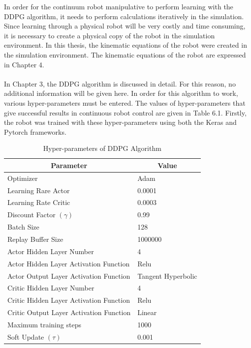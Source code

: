 \documentclass[12pt,twoside,a4]{mwbk}
\begin{document}
\noindent In order for the continuum robot manipulative to perform learning with the DDPG algorithm, it needs to perform calculations iteratively in the simulation. Since learning through a physical robot will be very costly and time consuming, it is necessary to create a physical copy of the robot in the simulation environment. In this thesis, the kinematic equations of the robot were created in the simulation environment. The kinematic equations of the robot are expressed in Chapter 4.
\\ \\
In Chapter 3, the DDPG algorithm is discussed in detail. For this reason, no additional information will be given here. In order for this algorithm to work, various hyper-parameters must be entered. The values of hyper-parameters that give successful results in continuous robot control are given in Table 6.1. Firstly, the robot was trained with these hyper-parameters using both the Keras and Pytorch frameworks.
\newpage
\begin{table}[h!]
\centering
\begin{tabular}{||c c||} 
 \hline
 \textbf{Parameter} & \textbf{Value} \\ [0.5ex] 
    \hline\hline
    \multicolumn{1}{|l|}{Optimizer} & \multicolumn{1}{l|}{Adam} \\ \hline
    \multicolumn{1}{|l|}{Learning Rare Actor} & \multicolumn{1}{l|}{0.0001} \\ \hline
    \multicolumn{1}{|l|}{Learning Rate Critic} & \multicolumn{1}{l|}{0.0003} \\ \hline
    \multicolumn{1}{|l|}{Discount Factor $(\gamma)$} & \multicolumn{1}{l|}{0.99} \\ \hline
    \multicolumn{1}{|l|}{Batch Size} & \multicolumn{1}{l|}{128} \\ \hline
    \multicolumn{1}{|l|}{Replay Buffer Size} & \multicolumn{1}{l|}{1000000} \\ \hline
    \multicolumn{1}{|l|}{Actor Hidden Layer Number} & \multicolumn{1}{l|}{4} \\ \hline
    \multicolumn{1}{|l|}{Actor Hidden Layer Activation Function} & \multicolumn{1}{l|}{Relu} \\ \hline
    \multicolumn{1}{|l|}{Actor Output Layer Activation Function} & \multicolumn{1}{l|}{Tangent Hyperbolic} \\ \hline
    \multicolumn{1}{|l|}{Critic Hidden Layer Number} & \multicolumn{1}{l|}{4} \\ \hline
    \multicolumn{1}{|l|}{Critic Hidden Layer Activation Function} & \multicolumn{1}{l|}{Relu} \\ \hline
    \multicolumn{1}{|l|}{Critic Output Layer Activation Function} & \multicolumn{1}{l|}{Linear} \\ \hline
    \multicolumn{1}{|l|}{Maximum training steps} & \multicolumn{1}{l|}{1000} \\ \hline
    \multicolumn{1}{|l|}{Soft Update $(\tau)$} & \multicolumn{1}{l|}{0.001} \\ \hline
\end{tabular}
\caption{Hyper-parameters of DDPG Algorithm}
\end{table}
\end{document}
